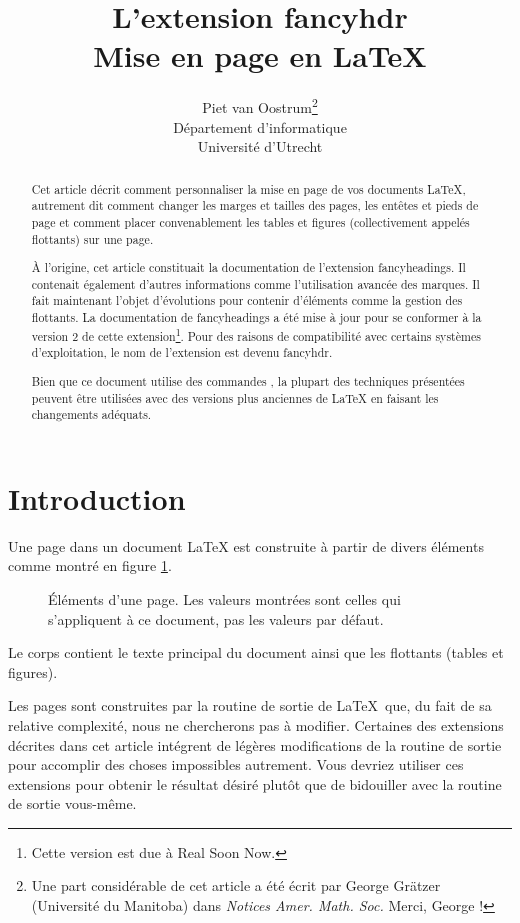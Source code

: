 \documentclass[a4paper]{article}
\title{L'extension \textsf{fancyhdr}\\Mise en page en \LaTeX}
\author{Piet van Oostrum\thanks{Une part considérable de cet article a été 
    écrit par George
    Gr\"atzer (Université du Manitoba) dans \emph{Notices Amer. Math. Soc.}
    Merci, George !}\\
  Département d'informatique\\
  Université d'Utrecht}
\begin{document}
\maketitle
\begin{abstract}
  Cet article décrit comment personnaliser la mise en page de vos documents
  \LaTeX{}, autrement dit comment changer les marges et tailles des pages,
  les entêtes et pieds de page et comment placer convenablement les tables
  et figures (collectivement appelés flottants) sur une page.

  À l'origine, cet article constituait la documentation de l'extension
  \textsf{fancyheadings}. Il contenait également d'autres informations comme 
  l'utilisation avancée des marques. Il fait maintenant l'objet d'évolutions
  pour contenir d'éléments comme la gestion des flottants. La documentation de
  \textsf{fancyheadings} a été mise à jour pour se conformer à la version 2 de
  cette extension\footnote{Cette version est due à Real Soon Now.}. Pour des 
  raisons de compatibilité avec certains systèmes d'exploitation, le nom de 
  l'extension est devenu \textsf{fancyhdr}.

  Bien que ce document utilise des commandes \LaTeXe{}, la plupart des 
  techniques présentées peuvent être utilisées avec des versions plus anciennes
  de \LaTeX{} en faisant les changements adéquats.
\end{abstract}
\tableofcontents


\section{Introduction}
\label{sec:intro}

Une page dans un document \LaTeX{} est construite à partir de divers éléments
comme montré en figure \ref{fig:layout}. 
\begin{figure}[htbp]
  \begin{center}
    \leavevmode
    \layout
    \vspace{3cm}
    \caption{\'{E}léments d'une page. Les valeurs montrées sont celles qui 
             s'appliquent à ce document, pas les valeurs par défaut.}
    \label{fig:layout}
  \end{center}
\end{figure}
\thispagestyle{plain}
Le corps contient le texte principal du document ainsi que les \og flottants
\fg{} (tables et figures).

Les pages sont construites par la routine de sortie de \LaTeX\ que, du fait de
sa relative complexité, nous ne chercherons pas à modifier. Certaines des
extensions décrites dans cet article intégrent de légères modifications de la 
routine de sortie pour accomplir des choses impossibles autrement. Vous devriez
utiliser ces extensions pour obtenir le résultat désiré plutôt que de
bidouiller avec la routine de sortie vous-même.
\end{document}
